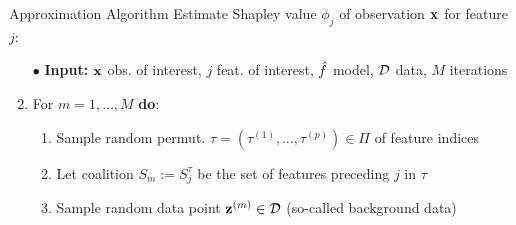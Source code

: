 \documentclass[10pt,compress,t,notes=noshow, xcolor=table]{beamer}
\newcommand{\Sm}{S_m}%
\newcommand{\Smj}{\Sm \cup \{j\}}
\newcommand{\minusSmj}{- \{\Sm \cup \{j\} \} }
\newcommand{\Stau}{S_{j}^\tau}%
\newcommand{\xjp}{\xv_{+j}^{(m)}}
\begin{document}
\begin{frame}{Approximation Algorithm }
Estimate Shapley value $\phi_j$ of observation $\mathbf{x}$ for feature $j$:

  \begin{enumerate}[<+->]
  \item[$\bullet$] \textbf{Input:} $\mathbf{x}$ obs. of interest, $j$ feat. of interest, $\hat{f}$ model, $\mathcal{D}$ data, $M$ iterations
      \item For $m = 1, \ldots, M$ \textbf{do}:
      \begin{enumerate}
        \item Sample random permut. $\tau = (\tau^{(1)}, \ldots, \tau^{(p)}) \in \Pi$ of feature indices%
        \item Let coalition $\Sm := \Stau$ be the set of features preceding $j$ in $\tau$
        \item Sample random data point {\color{blue} $\mathbf{z}^{(m)} \in \mathcal{D}$} (so-called background data)%

\end{enumerate}
\end{enumerate}
\end{frame}
\end{document}
